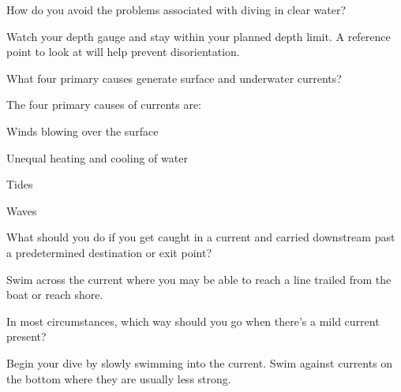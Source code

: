 
	\begin{qanda}
		\begin{question}
How do you avoid the problems associated with diving in clear water?
		\end{question}

		\begin{answer}
Watch your depth gauge and stay within your planned depth limit.  A reference point to look at will help prevent disorientation.
		\end{answer}
	\end{qanda}

	\begin{qanda}
		\begin{question}
What four primary causes generate surface and underwater currents?
		\end{question}

		\begin{answer}
The four primary causes of currents are:
			\begin{nospacenumberedlist}
				\item Winds blowing over the surface
				\item Unequal heating and cooling of water
				\item Tides
				\item Waves
			\end{nospacenumberedlist}
		\end{answer}
	\end{qanda}

	\begin{qanda}
		\begin{question}
What should you do if you get caught in a current and carried downstream past a predetermined destination or exit point?
		\end{question}

		\begin{answer}
Swim across the current where you may be able to reach a line trailed from the boat or reach shore.
		\end{answer}
	\end{qanda}

	\begin{qanda}
		\begin{question}
In most circumstances, which way should you go when there's a mild current present?
		\end{question}

		\begin{answer}
Begin your dive by slowly swimming into the current.  Swim against currents on the bottom where they are usually less strong.
		\end{answer}
	\end{qanda}

